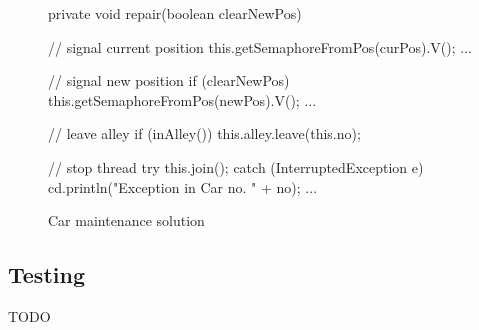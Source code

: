 \begin{figure}[H]
  \begin{java}
private void repair(boolean clearNewPos) {
    // signal current position
    this.getSemaphoreFromPos(curPos).V();
    ...

    // signal new position
    if (clearNewPos) {
        this.getSemaphoreFromPos(newPos).V();
        ...
    }

    // leave alley
    if (inAlley())
        this.alley.leave(this.no);

    // stop thread
    try {
        this.join();
    } catch (InterruptedException e) {
        cd.println("Exception in Car no. " + no);
        ...
    }
}
  \end{java}
  \caption{Car maintenance solution}
\label{lst:main-rep}  
\end{figure}


\subsection{Testing}
\label{sub:main-test}
TODO
